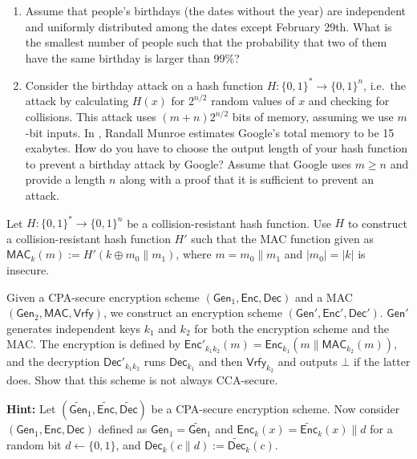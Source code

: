 \documentclass[a4paper,10pt,landscape,twocolumn]{scrartcl}
\begin{document}
\begin{exercise}
\begin{enumerate}
	\item Assume that people's birthdays (the dates without the year) are independent and uniformly distributed among the dates except February 29th. What is the smallest number of people such that the probability that two of them have the same birthday is larger than 99\%?
	\item Consider the birthday attack on a hash function $H: \{0,1\}^*\to\{0,1\}^n$, i.e.\ the attack by calculating $H(x)$ for $2^{n/2}$ random values of $x$ and checking for collisions. This attack uses $(m+n)2^{n/2}$ bits of memory, assuming we use $m$-bit inputs. In , Randall Munroe estimates Google's total memory to be 15 exabytes.  How do you have to choose the output length of your hash function to prevent a birthday attack by Google? Assume that Google uses $m\ge n$ and provide a length $n$ along with a proof that it is sufficient to prevent an attack.
\end{enumerate}
\end{exercise}



\begin{exercise}[HMAC?]
  Let $H: \{0,1\}^*\to \{0,1\}^n$ be a collision-resistant hash function. Use $H$ to construct a collision-resistant hash function $H'$ such that the MAC function given as $\mathsf{MAC}_k(m) := H'(k\oplus m_0\|m_1)$, where $m=m_0\|m_1$ and $|m_0|=|k|$ is insecure.
\end{exercise}

\begin{exercise}

Given a CPA-secure encryption scheme $(\mathsf{Gen}_1, \mathsf{Enc}, \mathsf{Dec})$ and a MAC $(\mathsf{Gen}_2, \mathsf{MAC}, \mathsf{Vrfy})$, we construct an encryption scheme $(\mathsf{Gen}', \mathsf{Enc}', \mathsf{Dec}')$. $\mathsf{Gen}'$ generates independent keys $k_1$ and $k_2$ for both the encryption scheme and the MAC. The encryption is defined by $\mathsf{Enc}'_{k_1k_2}(m)=\mathsf{Enc}_{k_1}(m\|\mathsf{MAC}_{k_2}(m))$, and the decryption $\mathsf{Dec}'_{k_1k_2}$ runs $\mathsf{Dec}_{k_1}$ and then $\mathsf{Vrfy}_{k_2}$ and outputs $\bot$ if the latter does. Show that this scheme is not always CCA-secure.

\textbf{Hint:} Let $(\mathsf{\widetilde{Gen}}_1, \mathsf{\widetilde{Enc}}, \mathsf{\widetilde{Dec}})$ be a CPA-secure encryption scheme. Now consider $(\mathsf{Gen}_1, \mathsf{Enc}, \mathsf{Dec})$ defined as 
$\mathsf{Gen}_1 = \mathsf{\widetilde{Gen}}_1$ and $\mathsf{Enc}_k(x) =  \mathsf{\widetilde{Enc}}_k(x) \| d$ for a random bit $d \leftarrow \{0,1\}$, and $\mathsf{Dec}_k(c \| d) := \mathsf{\widetilde{Dec}}_k(c)$.

\end{exercise}
\end{document}
